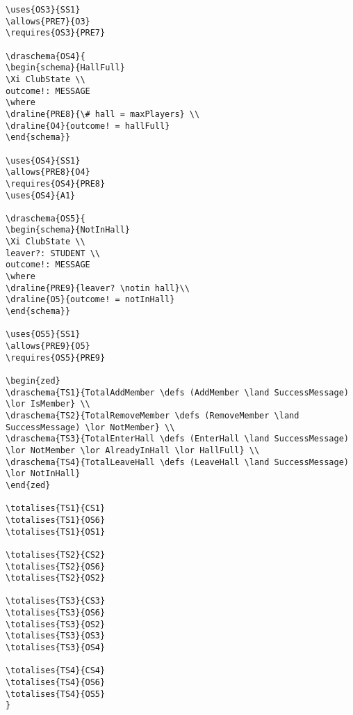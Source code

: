 \begin{verbatim}
\uses{OS3}{SS1}
\allows{PRE7}{O3}
\requires{OS3}{PRE7}

\draschema{OS4}{
\begin{schema}{HallFull}
\Xi ClubState \\
outcome!: MESSAGE
\where
\draline{PRE8}{\# hall = maxPlayers} \\
\draline{O4}{outcome! = hallFull}
\end{schema}}

\uses{OS4}{SS1}
\allows{PRE8}{O4}
\requires{OS4}{PRE8}
\uses{OS4}{A1}

\draschema{OS5}{
\begin{schema}{NotInHall}
\Xi ClubState \\
leaver?: STUDENT \\
outcome!: MESSAGE
\where
\draline{PRE9}{leaver? \notin hall}\\
\draline{O5}{outcome! = notInHall}
\end{schema}}

\uses{OS5}{SS1}
\allows{PRE9}{O5}
\requires{OS5}{PRE9}

\begin{zed}
\draschema{TS1}{TotalAddMember \defs (AddMember \land SuccessMessage) \lor IsMember} \\
\draschema{TS2}{TotalRemoveMember \defs (RemoveMember \land SuccessMessage) \lor NotMember} \\
\draschema{TS3}{TotalEnterHall \defs (EnterHall \land SuccessMessage) \lor NotMember \lor AlreadyInHall \lor HallFull} \\
\draschema{TS4}{TotalLeaveHall \defs (LeaveHall \land SuccessMessage) \lor NotInHall}
\end{zed}

\totalises{TS1}{CS1}
\totalises{TS1}{OS6}
\totalises{TS1}{OS1}

\totalises{TS2}{CS2}
\totalises{TS2}{OS6}
\totalises{TS2}{OS2}

\totalises{TS3}{CS3}
\totalises{TS3}{OS6}
\totalises{TS3}{OS2}
\totalises{TS3}{OS3}
\totalises{TS3}{OS4}

\totalises{TS4}{CS4}
\totalises{TS4}{OS6}
\totalises{TS4}{OS5}
}


\end{verbatim}